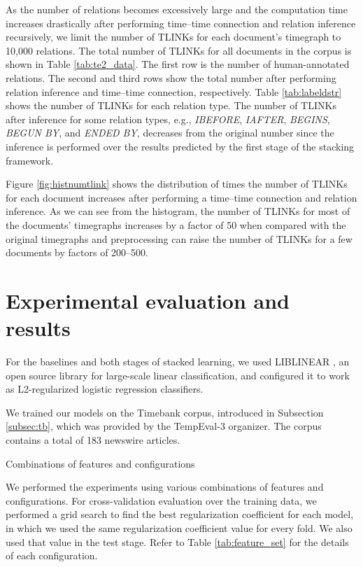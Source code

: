 \documentclass[english]{jnlp_1.4}
\begin{document}
As the number of relations becomes excessively large and the computation time increases drastically after performing time--time connection and relation inference recursively, we limit the number of TLINKs for each document's timegraph to 10,000 relations.
The total number of TLINKs for all documents in the corpus is shown in Table \ref{tab:te2_data}.
The first row is the number of human-annotated relations. 
The second and third rows show the total number after performing relation inference and time--time connection, respectively. 
Table \ref{tab:labeldstr} shows the number of TLINKs for each relation type.
The number of TLINKs after inference for some relation types, e.g., \emph{\footnotesize IBEFORE}, \emph{\footnotesize IAFTER}, \emph{\footnotesize BEGINS}, \emph{\footnotesize BEGUN BY}, and \emph{\footnotesize ENDED BY}, decreases from the original number since the inference is performed over the results predicted by the first stage of the stacking framework.

Figure \ref{fig:histnumtlink} shows the distribution of times the number of TLINKs for each document increases after performing a time--time connection and relation inference.
As we can see from the histogram, the number of TLINKs for most of the documents' timegraphs increases by a factor of 50 when compared with the original timegraphs and preprocessing can raise the number of TLINKs for a few documents by factors of 200--500.


\section{Experimental evaluation and results}
\label{sec:exp}

For the baselines and both stages of stacked learning, we used LIBLINEAR \cite{liblinear}, an open source library for large-scale linear classification, and configured it to work as L2-regularized logistic regression classifiers. 

We trained our models on the Timebank corpus, introduced in Subsection \ref{subsec:tb}, which was provided by the TempEval-3 organizer. 
The corpus contains a total of 183 newswire articles.

\begin{table}[b]
\caption{Combinations of features and configurations}
\label{tab:feature_set}

\end{table}

We performed the experiments using various combinations of features and configurations.
For cross-validation evaluation over the training data, we performed a grid search to find the best regularization coefficient for each model, in which we used the same regularization coefficient value for every fold. 
We also used that value in the test stage.
Refer to Table \ref{tab:feature_set} for the details of each configuration.
\end{document}
